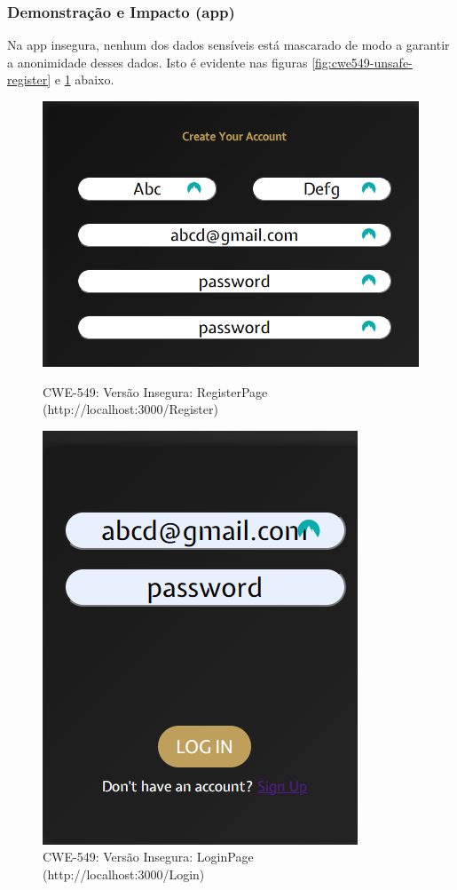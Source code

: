 \subsubsection{Demonstração e Impacto (app)}
Na app insegura, nenhum dos dados sensíveis está mascarado de modo a garantir a anonimidade desses dados. Isto é evidente nas figuras  \ref{fig:cwe549-unsafe-register} e \ref{fig:cwe549-unsafe-login} abaixo.

\begin{figure}[H]
  \centering
  \begin{minipage}{0.45\textwidth}
    \centering
    \includegraphics[width=0.8\linewidth]{images/CWE549-unsafe-register.png}
    \caption{CWE-549: Versão Insegura: RegisterPage (http://localhost:3000/Register)}
    \label{fig:cwe549-unsafe-register}
  \end{minipage}\hfill
  \begin{minipage}{0.45\textwidth}
    \centering
    \includegraphics[width=0.8\linewidth]{images/CWE549-unsafe-login.png}
    \caption{CWE-549: Versão Insegura: LoginPage  (http://localhost:3000/Login)}
    \label{fig:cwe549-unsafe-login}
  \end{minipage}
\end{figure}

